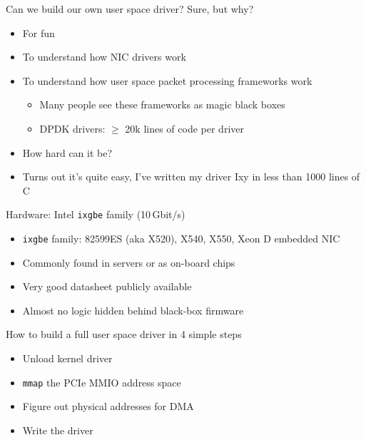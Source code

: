 \documentclass[NET,english,aspectratio=169]{tumbeamer}
\begin{document}
\begin{frame}{Can we build our own user space driver?}
Sure, but why?
\begin{itemize}
\item For fun 
\item To understand how NIC drivers work
\item To understand how user space packet processing frameworks work
\begin{itemize}
\item Many people see these frameworks as magic black boxes
\item DPDK drivers: $\ge$ 20k lines of code per driver
\end{itemize}
\item How hard can it be?
\item Turns out it's quite easy, I've written my driver Ixy in less than 1000 lines of C
\end{itemize}
\end{frame}

\begin{frame}{Hardware: Intel \texttt{ixgbe} family (10\,Gbit/s)}
\begin{itemize}
\item \texttt{ixgbe} family: 82599ES (aka X520), X540, X550, Xeon D embedded NIC
\item Commonly found in servers or as on-board chips
\item Very good datasheet publicly available
\item Almost no logic hidden behind black-box firmware
\end{itemize}
\end{frame}

\begin{frame}{How to build a full user space driver in 4 simple steps}
\begin{itemize}
\item[1.] Unload kernel driver
\item[2.] \texttt{mmap} the PCIe MMIO address space
\item[3.] Figure out physical addresses for DMA
\item[4.] Write the driver
\end{itemize}
\end{frame}
\end{document}
